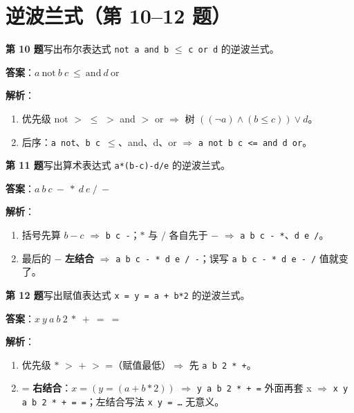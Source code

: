 \documentclass[12pt,a4paper,fontset=windows]{ctexart}
\newcommand{\imp}{\ensuremath{\Rightarrow}}
\begin{document}
\section{逆波兰式（第 10--12 题）}

\begin{qbox}
{\large\bfseries 第 10 题}\quad 写出布尔表达式 \texttt{not a and b} $\le$ \texttt{c or d} 的逆波兰式。
\end{qbox}

\textbf{答案}：$a\ \text{not}\ b\ c\ {\le}\ \text{and}\ d\ \text{or}$

\textbf{解析}：
\begin{enumerate}
\item 优先级 not $>$ $\le$ $>$ and $>$ or \imp{} 树 $((\neg a) \wedge (b \le c)) \vee d$。
\item 后序：\texttt{a not}、\texttt{b c $\le$}、and、d、or \imp{} \texttt{a not b c <= and d or}。
\end{enumerate}

\begin{qbox}
{\large\bfseries 第 11 题}\quad 写出算术表达式 \texttt{a*(b-c)-d/e} 的逆波兰式。
\end{qbox}

\textbf{答案}：$a\ b\ c\ {-}\ {*}\ d\ e\ /\ {-}$

\textbf{解析}：
\begin{enumerate}
\item 括号先算 $b-c$ \imp{} \texttt{b c -}；$*$ 与 $/$ 各自先于 $-$ \imp{} \texttt{a b c - *}、\texttt{d e /}。
\item 最后的 $-$ \textbf{左结合} \imp{} \texttt{a b c - * d e / -}；误写 \texttt{a b c - * d e - /} 值就变了。
\end{enumerate}

\begin{qbox}
{\large\bfseries 第 12 题}\quad 写出赋值表达式 \texttt{x = y = a + b*2} 的逆波兰式。
\end{qbox}

\textbf{答案}：$x\ y\ a\ b\ 2\ {*}\ {+}\ =\ =$

\textbf{解析}：
\begin{enumerate}
\item 优先级 $*$ $>$ $+$ $>$ =（赋值最低）\imp{} 先 \texttt{a b 2 * +}。
\item = \textbf{右结合}：$x=(y=(a+b*2))$ \imp{} \texttt{y a b 2 * + =} 外面再套 x \imp{} \texttt{x y a b 2 * + = =}；左结合写法 \texttt{x y = …} 无意义。
\end{enumerate}
\end{document}
